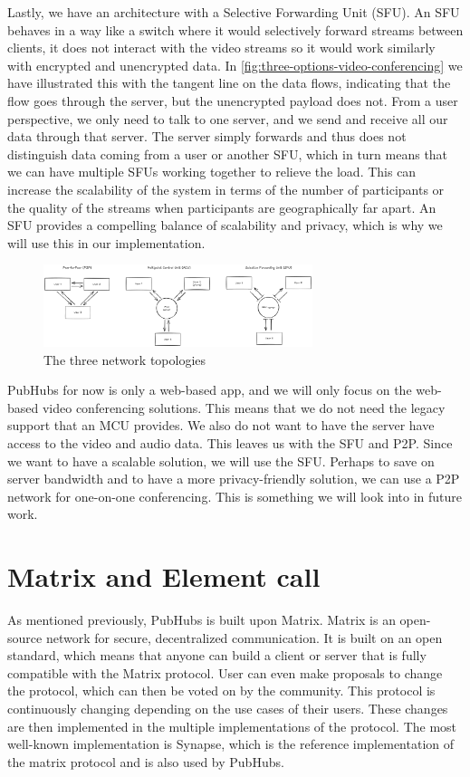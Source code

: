 \documentclass{report}
\begin{document}
Lastly, we have an architecture with a Selective Forwarding Unit (SFU). An SFU behaves in a way like a switch where it
would selectively forward streams between clients, it does not interact with the video streams so it would work
similarly with encrypted and unencrypted data.  In \autoref{fig:three-options-video-conferencing} we have
illustrated this with the tangent line on the data flows, indicating that the flow goes through the server, but
the unencrypted payload does not. From a user perspective, we only need to talk to one server, and we
send and receive all our data through that server.  The server simply forwards and thus does not distinguish data
coming from a user or another SFU, which in turn means that we can have multiple SFUs working together to relieve
the load. This can increase the scalability of the system in terms of the number of participants or the quality of the streams when
participants are geographically far apart. An SFU provides a compelling balance of scalability and privacy, which is
why we will use this in our implementation.

\begin{figure}[!hbt]
\centering
\includegraphics[width=0.7\textwidth]{img/thesisDPD}
\caption{The three network topologies}
\label{fig:three-options-video-conferencing}
\end{figure}

PubHubs for now is only a web-based app, and we will only focus on the web-based video conferencing solutions. This means
that we do not need the legacy support that an MCU provides. We also do not want to have the server have access to the
video and audio data. This leaves us with the SFU and P2P. Since we want to have a scalable solution, we will use
the SFU.
Perhaps to save on server bandwidth and to have a more privacy-friendly solution, we can use a P2P network for one-on-one
conferencing. This is something we will look into in future work.

\section{Matrix and Element call}\label{sec:matrix}
As mentioned previously, PubHubs is built upon Matrix. Matrix is an open-source network for secure, decentralized
communication. It is built on an open standard, which means that anyone can build a client or server that is fully
compatible with the Matrix protocol. User can even make proposals to change the protocol, which can then be voted on
by the community. This protocol is continuously changing depending on the use cases of their users. These changes
are then implemented in the multiple implementations of the protocol. The most well-known implementation is Synapse,
which is the reference implementation of the matrix protocol and is also used by PubHubs.
\end{document}
